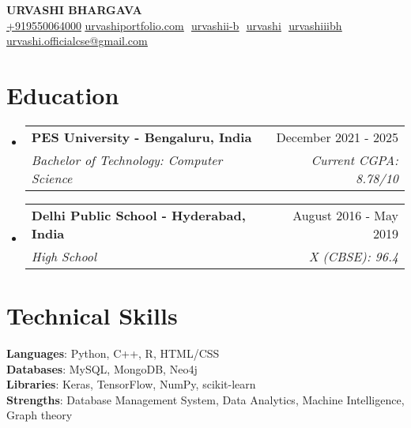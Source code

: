 \documentclass[letterpaper,11pt]{article}
\makeatletter
\newcommand{\resumeSubheading}[4]{
  \vspace{-2pt}\item
    \begin{tabular*}{0.97\textwidth}[t]{l@{\extracolsep{\fill}}r}
      \textbf{#1} & #2 \\
      \textit{\small#3} & \textit{\small #4} \\
    \end{tabular*}\vspace{-7pt}
}
\newcommand{\resumeSubHeadingListStart}{\begin{itemize}[leftmargin=0.15in, label={}]}
\newcommand{\resumeSubHeadingListEnd}{\end{itemize}}
\makeatother
\begin{document}
\begin{flushright}
  \vspace{-4pt}
  \color{gray}
  \item
\end{flushright}

\vspace{-7pt}

\begin{center}
    \textbf{\Huge \scshape URVASHI BHARGAVA} \\ \vspace{8pt}
    \small 
    \href{tel:+919550064000}{+919550064000}
    \href{https://urvashiportfolio.com/}
    {\underline{urvashiportfolio.com}} $  $
    \href{https://github.com/urvashii-b}
    {\underline{urvashii-b}} $  $
    \href{https://www.linkedin.com/in/urvashi-bhargava-b66100262/}{\underline{urvashi}} $  $
    \href{https://leetcode.com/urvashiiibh/}{\underline{urvashiiibh}} $  $
    \href{mailto:urvashi.officialcse@gmail.com}
    {\underline{urvashi.officialcse@gmail.com}} $  $
    
    
\end{center}

    
\section{Education}
  \resumeSubHeadingListStart
  
    \resumeSubheading
      {PES University - Bengaluru, India}{December 2021 - 2025}
      {Bachelor of Technology: Computer Science}{Current CGPA: 8.78/10}

    \resumeSubheading
      {Delhi Public School - Hyderabad, India}{August 2016 - May 2019}
      {High School}{X (CBSE): 96.4}
      
    \vspace{3pt}
  \resumeSubHeadingListEnd
    
\section{Technical Skills}
 \begin{itemize}[leftmargin=0.15in, label={}]
    \small{\item{

     \textbf{Languages}{: Python, C++, R, HTML/CSS} \\
     

     \textbf{Databases}{: MySQL, MongoDB, Neo4j} \\
     
     \textbf{Libraries}{: Keras, TensorFlow, NumPy, scikit-learn}  \\

     \textbf{Strengths}{: Database Management System, Data Analytics, Machine Intelligence, Graph theory} \\
    }}
 \end{itemize}
\end{document}
